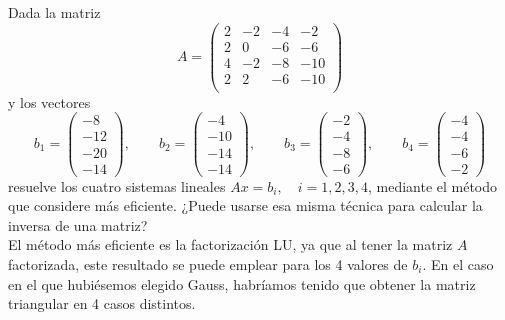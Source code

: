 \begin{ejercicio}
\begin{enumerate}
    \end{enumerate}
    
\end{ejercicio}


\begin{ejercicio}
    Dada la matriz
    $$A = \left( \begin{array}{cccc}
        2 & -2 & -4 & -2 \\
        2 & 0 & -6 & -6 \\
        4 & -2 & -8 & -10 \\
        2 & 2 & -6 & -10 \\
    \end{array}\right)$$
    y los vectores
    \begin{equation*}
        b_1 = \left(\begin{array}{c}
            -8 \\ -12 \\ -20 \\ -14
        \end{array}\right), \qquad
        b_2 = \left( \begin{array}{c}
            -4 \\ -10 \\ -14 \\ -14
        \end{array}\right), \qquad
        b_3 = \left( \begin{array}{c}
            -2 \\ -4 \\ -8 \\ -6
        \end{array}\right), \qquad
        b_4 = \left( \begin{array}{c}
            -4 \\ -4 \\ -6 \\ -2
        \end{array}\right)
    \end{equation*}
    resuelve los cuatro sistemas lineales $Ax=b_i,\quad i=1,2,3,4$, mediante el método que considere más eficiente. ¿Puede usarse esa misma técnica para calcular la inversa de una matriz?\\

    El método más eficiente es la factorización LU, ya que al tener la matriz $A$ factorizada, este resultado se puede emplear para los 4 valores de $b_i$. En el caso en el que hubiésemos elegido Gauss, habríamos tenido que obtener la matriz triangular en 4 casos distintos.


\end{ejercicio}
